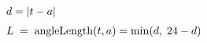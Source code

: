 \documentclass[12pt]{article}
\begin{document}
\[\begin{array}{@{}l@{}}
  d = \lvert t - a \rvert \\[6pt]
  L \;=\; \len(t,a) = \min(d,\; 24 - d)
\end{array}\]
\end{document}
